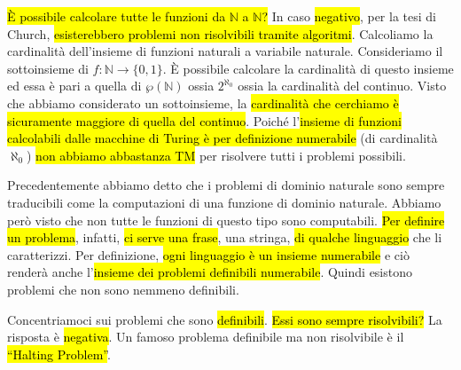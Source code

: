 \documentclass[a4paper,11pt,oneside]{article}
\theoremstyle{plain}
\theoremstyle{definition}
\theoremstyle{remark}
\begin{document}
\hl{È possibile calcolare tutte le funzioni da $\mathbb{N}$ a $\mathbb{N}$?} In
caso \hl{negativo}, per la tesi di Church, \hl{esisterebbero problemi non
risolvibili tramite algoritmi}. Calcoliamo la cardinalità dell'insieme di
funzioni naturali a variabile naturale. Consideriamo il sottoinsieme di $f:
\mathbb{N} \to \{0,1\}$. È possibile calcolare la cardinalità di questo insieme
ed essa è pari a quella di $\wp(\mathbb{N})$ ossia $2^{\aleph_0}$ ossia la
cardinalità del continuo. Visto che abbiamo considerato un sottoinsieme, la
\hl{cardinalità che cerchiamo è sicuramente maggiore di quella del continuo}.
Poiché l'\hl{insieme di funzioni calcolabili dalle macchine di Turing è per
definizione numerabile} (di cardinalità $\aleph_0$) \hl{non abbiamo abbastanza
TM} per risolvere tutti i problemi possibili.

Precedentemente abbiamo detto che i problemi di dominio naturale sono sempre
traducibili come la computazioni di una funzione di dominio naturale. Abbiamo
però visto che non tutte le funzioni di questo tipo sono computabili. \hl{Per
definire un problema}, infatti, \hl{ci serve una frase}, una stringa, \hl{di
qualche linguaggio} che li caratterizzi. Per definizione, \hl{ogni linguaggio è
un insieme numerabile} e ciò renderà anche l'\hl{insieme dei problemi definibili
numerabile}. Quindi esistono problemi che non sono nemmeno definibili.

Concentriamoci sui problemi che sono \hl{definibili}. \hl{Essi sono sempre
risolvibili?} La risposta è \hl{negativa}. Un famoso problema definibile ma non
risolvibile è il \hl{``Halting Problem''}.
\end{document}
